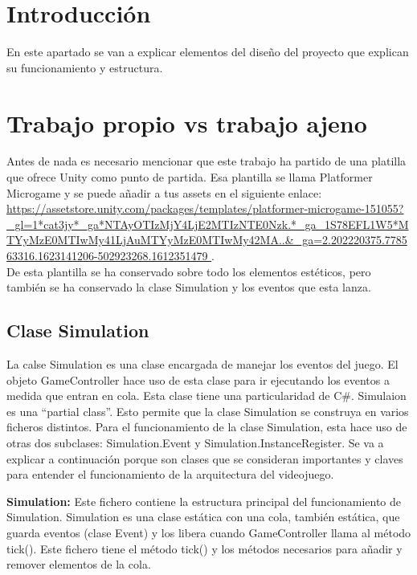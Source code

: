 
\section{Introducción}
En este apartado se van a explicar elementos del diseño del proyecto que explican su funcionamiento y estructura.

\section{Trabajo propio vs trabajo ajeno}
Antes de nada es necesario mencionar que este trabajo ha partido de una platilla que ofrece Unity como punto de partida. Esa plantilla se llama Platformer Microgame y se puede añadir a tus assets en el siguiente enlace:\\
 \url{https://assetstore.unity.com/packages/templates/platformer-microgame-151055?_gl=1*cat3jy*_ga*NTAyOTIzMjY4LjE2MTIzNTE0Nzk.*_ga_1S78EFL1W5*MTYyMzE0MTIwMy41LjAuMTYyMzE0MTIwMy42MA..&_ga=2.202220375.778563316.1623141206-502923268.1612351479
}.\\ 
De esta plantilla se ha conservado sobre todo los elementos estéticos, pero también se ha conservado la clase Simulation y los eventos que esta lanza.

\subsection{Clase Simulation}
La calse Simulation es una clase encargada de manejar los eventos del juego. El objeto GameController hace uso de esta clase para ir ejecutando los eventos a medida que entran en cola. Esta clase tiene una particularidad de C\#. Simulaion es una “partial class”. Esto permite que la clase Simulation se construya en varios ficheros distintos. Para el funcionamiento de la clase Simulation, esta hace uso de otras dos subclases: Simulation.Event y Simulation.InstanceRegister. Se va a explicar a continuación porque son clases que se consideran importantes y claves para entender el funcionamiento de la arquitectura del videojuego.

\textbf{Simulation:} Este fichero contiene la estructura principal del funcionamiento de Simulation. Simulation es una clase estática con una cola, también estática, que guarda eventos (clase Event) y los libera cuando GameController llama al método tick(). Este fichero tiene el método tick() y los métodos necesarios para añadir y remover elementos de la cola. 

